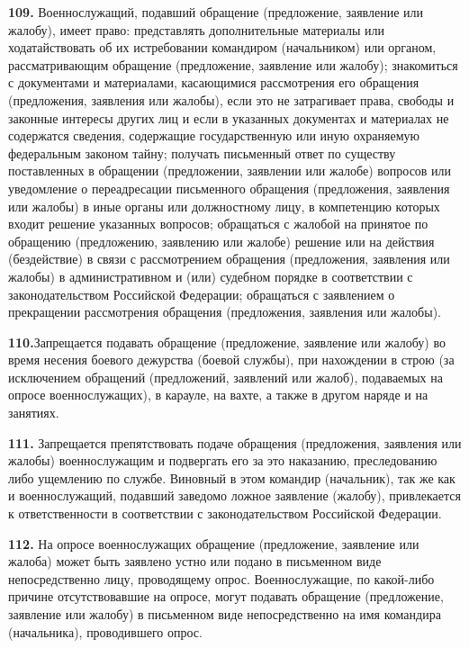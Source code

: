 \documentclass[12pt,a4paper]{report}
\begin{document}
\textbf{109.} Военнослужащий, подавший обращение (предложение, заявление или жалобу), имеет право:
представлять дополнительные материалы или ходатайствовать об их истребовании командиром (начальником) или органом, рассматривающим обращение (предложение, заявление или жалобу);
знакомиться с документами и материалами, касающимися рассмотрения его обращения (предложения, заявления или жалобы), если это не затрагивает права, свободы и законные интересы других лиц и если в указанных документах и материалах не содержатся сведения, содержащие государственную или иную охраняемую федеральным законом тайну;
получать письменный ответ по существу поставленных в обращении (предложении, заявлении или жалобе) вопросов или уведомление о переадресации письменного обращения (предложения, заявления или жалобы) в иные органы или должностному лицу, в компетенцию которых входит решение указанных вопросов;
обращаться с жалобой на принятое по обращению (предложению, заявлению или жалобе) решение или на действия (бездействие) в связи с рассмотрением обращения (предложения, заявления или жалобы) в административном и (или) судебном порядке в соответствии с законодательством Российской Федерации;
обращаться с заявлением о прекращении рассмотрения обращения (предложения, заявления или жалобы).


\textbf{110.}Запрещается подавать обращение (предложение, заявление или жалобу) во время несения боевого дежурства (боевой службы), при нахождении в строю (за исключением обращений (предложений, заявлений или жалоб), подаваемых на опросе военнослужащих), в карауле, на вахте, а также в другом наряде и на занятиях.



\textbf{111.} Запрещается препятствовать подаче обращения (предложения, заявления или жалобы) военнослужащим и подвергать его за это наказанию, преследованию либо ущемлению по службе. Виновный в этом командир (начальник), так же как и военнослужащий, подавший заведомо ложное заявление (жалобу), привлекается к ответственности в соответствии с законодательством Российской Федерации.



\textbf{112.} На опросе военнослужащих обращение (предложение, заявление или жалоба) может быть заявлено устно или подано в письменном виде непосредственно лицу, проводящему опрос.
Военнослужащие, по какой-либо причине отсутствовавшие на опросе, могут подавать обращение (предложение, заявление или жалобу) в письменном виде непосредственно на имя командира (начальника), проводившего опрос.
\end{document}
